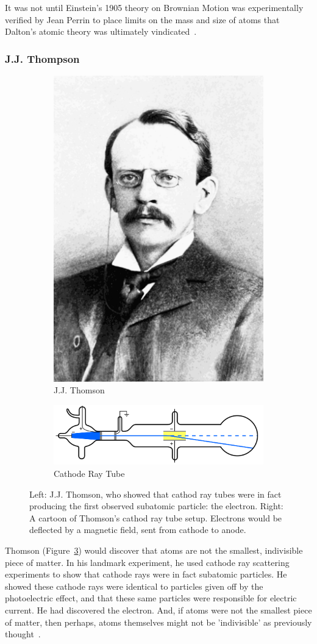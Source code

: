 It was not until Einstein's 1905 theory on Brownian Motion was experimentally
verified by Jean Perrin to place limits on the mass and size of atoms that
Dalton's atomic theory was ultimately vindicated~\cite{Patterson200750}.

\subsubsection{J.J. Thompson}

\begin{figure}[ht]
	\centering
	\begin{subfigure}{.4\textwidth}
		\centering
		\includegraphics[width=0.4\linewidth]{../Chapter2/fig/jjthomson.png}
		\caption{J.J. Thomson}
		\label{fig:jjthomson}
	\end{subfigure}%
	\begin{subfigure}{0.6\textwidth}
		\centering
		\includegraphics[width=0.4\linewidth]{../Chapter2/fig/cathoderaytube.png}
		\caption{Cathode Ray Tube}
		\label{fig:thomsoncathode}
	\end{subfigure}
	\caption{ 
		Left: J.J. Thomson, who showed that cathod ray tubes were in fact producing
		the first observed subatomic particle: the electron. Right: A cartoon of
		Thomson's cathod ray tube setup. Electrons would be deflected by a magnetic
		field, sent from cathode to anode.
	}
	\label{fig:thomsonrays}
\end{figure}

Thomson (Figure~\ref{fig:thomsonrays}) would discover that atoms are not the
smallest, indivisible piece of matter. In his landmark experiment, he used
cathode ray scattering experiments to show that cathode rays were in fact
subatomic particles. He showed these cathode rays were identical to particles
given off by the photoelectric effect, and that these same particles were
responsible for electric current. He had discovered the electron. And, if atoms
were not the smallest piece of matter, then perhaps, atoms themselves might not
be 'indivisible' as previously thought~\cite{nobelthomson2014}.


